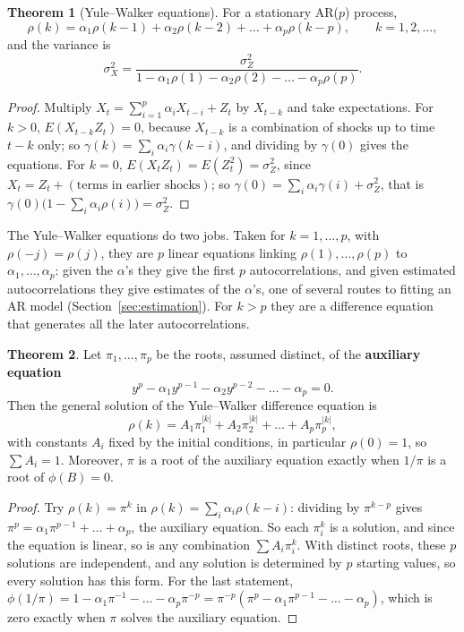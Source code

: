 \documentclass[11pt,a4paper]{article}
\theoremstyle{definition}
\newtheorem{thm}{Theorem}[subsection]
\begin{document}
\begin{thm}[Yule--Walker equations]\label{thm:yule-walker}
For a stationary AR($p$) process,
\[
\rho(k) = \alpha_1\rho(k - 1) + \alpha_2\rho(k - 2) + \dots + \alpha_p\rho(k - p) , \qquad k = 1, 2, \dots ,
\]
and the variance is
\[
\sigma_X^2 = \frac{\sigma_Z^2}{1 - \alpha_1\rho(1) - \alpha_2\rho(2) - \dots - \alpha_p\rho(p)} .
\]
\end{thm}

\begin{proof}
Multiply $X_t = \sum_{i=1}^p\alpha_iX_{t-i} + Z_t$ by $X_{t-k}$ and take expectations. For $k > 0$, $E(X_{t-k}Z_t) = 0$, because $X_{t-k}$ is a combination of
shocks up to time $t - k$ only; so $\gamma(k) = \sum_i\alpha_i\gamma(k - i)$, and dividing by $\gamma(0)$ gives the equations. For $k = 0$, $E(X_tZ_t) = E(Z_t^2) = \sigma_Z^2$,
since $X_t = Z_t + (\text{terms in earlier shocks})$; so $\gamma(0) = \sum_i\alpha_i\gamma(i) + \sigma_Z^2$, that is $\gamma(0)\bigl(1 - \sum_i\alpha_i\rho(i)\bigr) = \sigma_Z^2$.
\end{proof}

The Yule--Walker equations do two jobs. Taken for $k = 1, \dots, p$, with $\rho(-j) = \rho(j)$, they are $p$ linear equations linking
$\rho(1), \dots, \rho(p)$ to $\alpha_1, \dots, \alpha_p$: given the $\alpha$'s they give the first $p$ autocorrelations, and given estimated autocorrelations
they give estimates of the $\alpha$'s, one of several routes to fitting an AR model (Section~\ref{sec:estimation}). For $k > p$ they are a
difference equation that generates all the later autocorrelations.

\begin{thm}\label{thm:ar-acf-solution}
Let $\pi_1, \dots, \pi_p$ be the roots, assumed distinct, of the \textbf{auxiliary equation}
\[
y^p - \alpha_1y^{p-1} - \alpha_2y^{p-2} - \dots - \alpha_p = 0 .
\]
Then the general solution of the Yule--Walker difference equation is
\[
\rho(k) = A_1\pi_1^{|k|} + A_2\pi_2^{|k|} + \dots + A_p\pi_p^{|k|} ,
\]
with constants $A_i$ fixed by the initial conditions, in particular $\rho(0) = 1$, so $\sum A_i = 1$. Moreover, $\pi$ is a root of the auxiliary
equation exactly when $1/\pi$ is a root of $\phi(B) = 0$.
\end{thm}

\begin{proof}
Try $\rho(k) = \pi^k$ in $\rho(k) = \sum_i\alpha_i\rho(k - i)$: dividing by $\pi^{k-p}$ gives $\pi^p = \alpha_1\pi^{p-1} + \dots + \alpha_p$, the auxiliary equation. So each $\pi_i^k$ is a
solution, and since the equation is linear, so is any combination $\sum A_i\pi_i^k$. With distinct roots, these $p$ solutions are
independent, and any solution is determined by $p$ starting values, so every solution has this form. For the last
statement, $\phi(1/\pi) = 1 - \alpha_1\pi^{-1} - \dots - \alpha_p\pi^{-p} = \pi^{-p}(\pi^p - \alpha_1\pi^{p-1} - \dots - \alpha_p)$, which is zero exactly when $\pi$ solves the auxiliary
equation.
\end{proof}
\end{document}
